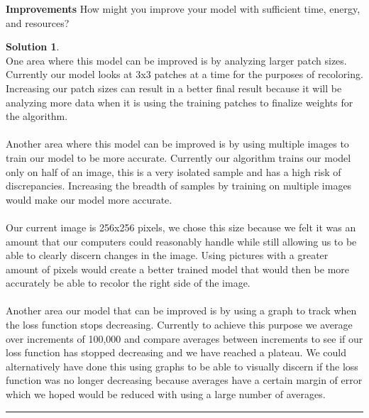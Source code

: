 \documentclass{article}
\theoremstyle{definition}
\def\fline{\rule{0.75\linewidth}{0.5pt}}
\newcommand{\finishline}{\vspace{-15pt}\begin{center}\fline\end{center}}
\newtheorem*{solution*}{Solution}
\newenvironment{solution}{\begin{solution*}}{{\finishline} \end{solution*}}
\begin{document}
    \textbf{Improvements}
        How might you improve your model with sufficient time, energy, and resources?
        \begin{solution} \hfill \\
        One area where this model can be improved is by analyzing larger patch sizes. Currently our model looks at 3x3 patches at a time for the purposes of recoloring. Increasing our patch sizes can result in a better final result because it will be analyzing more data when it is using the training patches to finalize weights for the algorithm.\\\\ Another area where this model can be improved is by using multiple images to train our model to be more accurate. Currently our algorithm trains our model only on half of an image, this is a very isolated sample and has a high risk of discrepancies. Increasing the breadth of samples by training on multiple images would make our model more accurate. \\\\
        Our current image is 256x256 pixels, we chose this size because we felt it was an amount that our computers could reasonably handle while still allowing us to be able to clearly discern changes in the image. Using pictures with a greater amount of pixels would create a better trained model that would then be more accurately be able to recolor the right side of the image. \\\\
        Another area our model that can be improved is by using a graph to track when the loss function stops decreasing. Currently to achieve this purpose we average over increments of 100,000 and compare averages between increments to see if our loss function has stopped decreasing and we have reached a plateau. We could alternatively have done this using graphs to be able to visually discern if the loss function was no longer decreasing because averages have a certain margin of error which we hoped would be reduced with using a large number of averages. 
        \end{solution}\\\\
\smallskip
\end{document}
